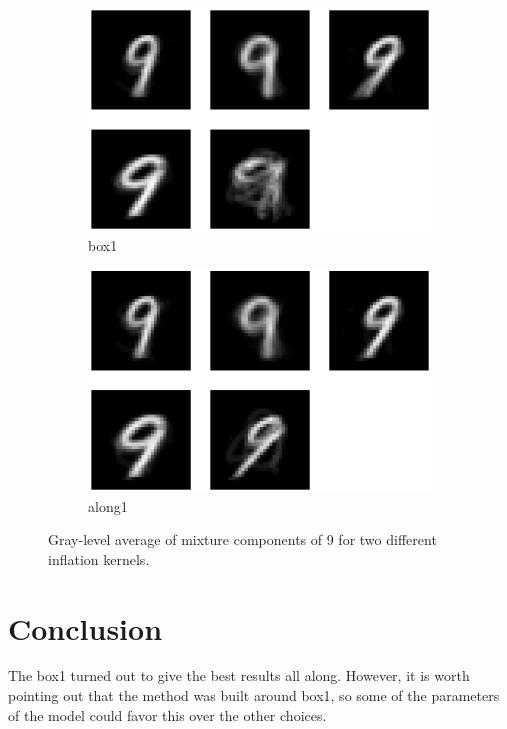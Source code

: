 \documentclass{report}
\begin{document}
\begin{figure}
        \begin{subfigure}[b]{0.45\textwidth}
                \centering
                \includegraphics[width=\textwidth]{figs/mixtures9-box1}
                \caption{box1}
                \label{fig:mix9box1}
        \end{subfigure}%
        \qquad %
        \begin{subfigure}[b]{0.45\textwidth}
                \centering
                \includegraphics[width=\textwidth]{figs/mixtures9-along1}
                \caption{along1}
                \label{fig:mix9along1}
        \end{subfigure}
        \caption{Gray-level average of mixture components of 9 for two different inflation kernels.}\label{fig:kernelmix}
\end{figure}

\section{Conclusion}
The box1 turned out to give the best results all along. However, it is worth pointing out that the method was built around box1, so some of the parameters of the model could favor this over the other choices.
\end{document}
